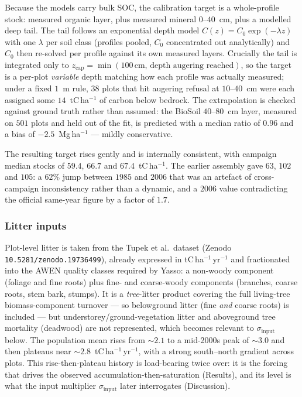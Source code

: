 \documentclass[11pt]{article}
\begin{document}
Because the models carry bulk SOC, the calibration target is a whole-profile
stock: measured organic layer, plus measured mineral $0$--$40$~cm, plus a
modelled deep tail. The tail follows an exponential depth model
$C(z)=C_0\exp(-\lambda z)$ with one $\lambda$ per soil class (profiles pooled,
$C_0$ concentrated out analytically) and $C_0$ then re-solved per profile against
its own measured layers. Crucially the tail is integrated only to
$z_{\mathrm{cap}}=\min(100\,\mathrm{cm},\,\text{depth augering reached})$, so the
target is a per-plot \emph{variable} depth matching how each profile was actually
measured; under a fixed $1$~m rule, $38$ plots that hit augering refusal at
$10$--$40$~cm were each assigned some $14$~tC\,ha$^{-1}$ of carbon below bedrock.
The extrapolation is checked against ground truth rather than assumed: the
BioSoil $40$--$80$~cm layer, measured on $501$ plots and held out of the fit, is
predicted with a median ratio of $0.96$ and a bias of $-2.5$~Mg\,ha$^{-1}$ ---
mildly conservative.

The resulting target rises gently and is internally consistent, with campaign
median stocks of $59.4$, $66.7$ and $67.4$~tC\,ha$^{-1}$. The earlier assembly
gave $63$, $102$ and $105$: a $62\%$ jump between $1985$ and $2006$ that was an
artefact of cross-campaign inconsistency rather than a dynamic, and a $2006$
value contradicting the official same-year figure by a factor of $1.7$.

\subsubsection{Litter inputs}
Plot-level litter is taken from the Tupek et al.\ dataset
(Zenodo \texttt{10.5281/zenodo.19736499}), already expressed in
tC\,ha$^{-1}$\,yr$^{-1}$ and fractionated into the AWEN quality classes required
by Yasso: a non-woody component (foliage and fine roots) plus fine- and
coarse-woody components (branches, coarse roots, stem bark, stumps). It is a
\emph{tree}-litter product covering the full living-tree biomass-component
turnover --- so belowground litter (fine \emph{and} coarse roots) is included ---
but understorey/ground-vegetation litter and aboveground tree mortality (deadwood)
are not represented, which becomes relevant to $\sigma_{\mathrm{input}}$ below. The population mean rises from $\sim\!2.1$ to a mid-2000s peak of
$\sim\!3.0$ and then plateaus near $\sim\!2.8$~tC\,ha$^{-1}$\,yr$^{-1}$, with a
strong south--north gradient across plots. This rise-then-plateau history is
load-bearing twice over: it is the forcing that drives the observed
accumulation-then-saturation (Results), and its level is what the input
multiplier $\sigma_{\mathrm{input}}$ later interrogates (Discussion).
\end{document}
